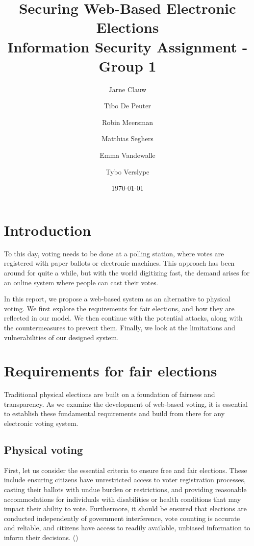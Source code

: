 \documentclass[a4paper,12pt,english]{article}
\title{Securing Web-Based Electronic Elections
\\
\large Information Security Assignment - Group 1}
\author{Jarne Clauw
    \and
    Tibo De Peuter
    \and
    Robin Meersman
    \and
    Matthias Seghers
    \and
    Emma Vandewalle
    \and
    Tybo Verslype
}
\date{\today}
\begin{document}
\maketitle

\section{Introduction}\label{sec:introduction}

To this day, voting needs to be done at a polling station, where votes are registered with paper ballots or electronic machines. This approach has been around for quite a while, but with the world digitizing fast, the demand arises for an online system where people can cast their votes.

In this report, we propose a web-based system as an alternative to physical voting. We first explore the requirements for fair elections, and how they are reflected in our model. We then continue with the potential attacks, along with the countermeasures to prevent them. Finally, we look at the limitations and vulnerabilities of our designed system.

\section{Requirements for fair elections}\label{sec:requirements}

Traditional physical elections are built on a foundation of fairness and transparency. As we examine the development of web-based voting, it is essential to establish these fundamental requirements and build from there for any electronic voting system.

\subsection{Physical voting}\label{sec:requirements-physical}

First, let us consider the essential criteria to ensure free and fair elections. These include ensuring citizens have unrestricted access to voter registration processes, casting their ballots with undue burden or restrictions, and providing reasonable accommodations for individuals with disabilities or health conditions that may impact their ability to vote. Furthermore, it should be ensured that elections are conducted independently of government interference, vote counting is accurate and reliable, and citizens have access to readily available, unbiased information to inform their decisions. (\cite{european-liberties-platform-2021})
\end{document}
